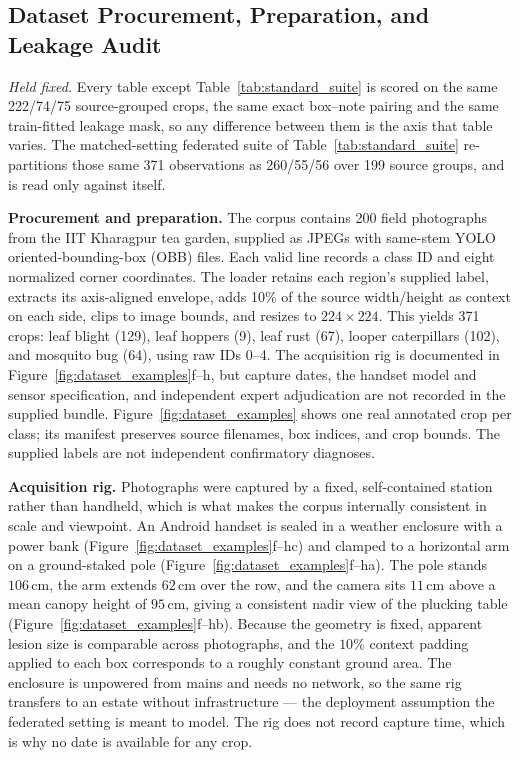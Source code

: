 \documentclass[conference]{IEEEtran}
\begin{document}
\subsection{Dataset Procurement, Preparation, and Leakage Audit}
\label{sec:dataset}

\emph{Held fixed.} Every table except Table~\ref{tab:standard_suite} is scored
on the same 222/74/75 source-grouped crops, the same exact box--note pairing and
the same train-fitted leakage mask, so any difference between them is the axis
that table varies. The matched-setting
federated suite of Table~\ref{tab:standard_suite} re-partitions those same 371
observations as 260/55/56 over 199 source groups, and is read only against itself.

\textbf{Procurement and preparation.} The corpus contains 200 field photographs
from the IIT Kharagpur tea garden, supplied as JPEGs with same-stem YOLO
oriented-bounding-box (OBB) files. Each valid line records a class ID and eight
normalized corner coordinates. The loader retains each region's supplied label,
extracts its axis-aligned envelope, adds 10\% of the source width/height as
context on each side, clips to image bounds, and resizes to $224\times224$.
This yields 371 crops: leaf blight (129), leaf hoppers (9), leaf rust (67),
looper caterpillars (102), and mosquito bug (64), using raw IDs 0--4.
The acquisition rig is documented in Figure~\ref{fig:dataset_examples}f--h, but capture
dates, the handset model and sensor specification, and independent expert
adjudication are not recorded in the supplied bundle. Figure~\ref{fig:dataset_examples} shows one
real annotated crop per class; its manifest preserves source filenames,
box indices, and crop bounds. The supplied labels are not independent
confirmatory diagnoses.

\textbf{Acquisition rig.} Photographs were captured by a fixed, self-contained
station rather than handheld, which is what makes the corpus internally
consistent in scale and viewpoint. An Android handset is sealed in a weather
enclosure with a power bank (Figure~\ref{fig:dataset_examples}f--hc) and clamped to a
horizontal arm on a ground-staked pole (Figure~\ref{fig:dataset_examples}f--ha). The pole
stands $106$\,cm, the arm extends $62$\,cm over the row, and the camera sits
$11$\,cm above a mean canopy height of $95$\,cm, giving a consistent nadir view
of the plucking table (Figure~\ref{fig:dataset_examples}f--hb). Because the geometry is
fixed, apparent lesion size is comparable across photographs, and the $10\%$
context padding applied to each box corresponds to a roughly constant ground
area. The enclosure is unpowered from mains and needs no network, so the same
rig transfers to an estate without infrastructure --- the deployment assumption
the federated setting is meant to model. The rig does not record capture time,
which is why no date is available for any crop.
\end{document}
